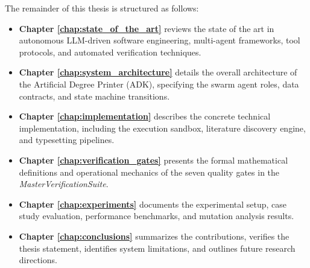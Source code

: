 The remainder of this thesis is structured as follows:
\begin{itemize}
    \item \textbf{Chapter \ref{chap:state_of_the_art}} reviews the state of the art in autonomous LLM-driven software engineering, multi-agent frameworks, tool protocols, and automated verification techniques.
    \item \textbf{Chapter \ref{chap:system_architecture}} details the overall architecture of the Artificial Degree Printer (ADK), specifying the swarm agent roles, data contracts, and state machine transitions.
    \item \textbf{Chapter \ref{chap:implementation}} describes the concrete technical implementation, including the execution sandbox, literature discovery engine, and typesetting pipelines.
    \item \textbf{Chapter \ref{chap:verification_gates}} presents the formal mathematical definitions and operational mechanics of the seven quality gates in the \emph{MasterVerificationSuite}.
    \item \textbf{Chapter \ref{chap:experiments}} documents the experimental setup, case study evaluation, performance benchmarks, and mutation analysis results.
    \item \textbf{Chapter \ref{chap:conclusions}} summarizes the contributions, verifies the thesis statement, identifies system limitations, and outlines future research directions.
\end{itemize}

